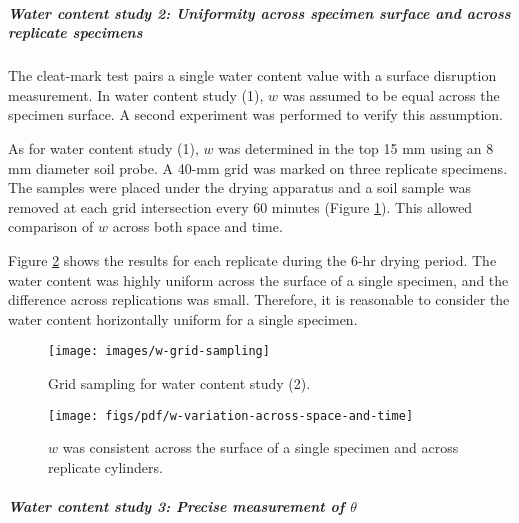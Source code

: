 \documentclass[
  letterpaper,
  openany]{book}
\begin{document}
\hypertarget{water-content-study-2-uniformity-across-specimen-surface-and-across-replicate-specimens}{%
\subparagraph{Water content study 2: Uniformity across specimen surface and across replicate specimens}\label{water-content-study-2-uniformity-across-specimen-surface-and-across-replicate-specimens}}

The cleat-mark test pairs a single water content value with a surface disruption measurement.
In water content study (1), \(w\) was assumed to be equal across the specimen surface.
A second experiment was performed to verify this assumption.

As for water content study (1), \(w\) was determined in the top 15 mm using an 8 mm diameter soil probe.
A 40-mm grid was marked on three replicate specimens. The samples were placed under the drying apparatus and a soil sample was removed at each grid intersection every 60 minutes (Figure \ref{fig:water-content-grid-photo}).
This allowed comparison of \(w\) across both space and time.

Figure \ref{fig:w-variation-across-space-and-time} shows the results for each replicate during the 6-hr drying period.
The water content was highly uniform across the surface of a single specimen, and the difference across replications was small.
Therefore, it is reasonable to consider the water content horizontally uniform for a single specimen.

\begin{figure}

{\centering \texttt{[image: images/w-grid-sampling]} 

}

\caption{Grid sampling for water content study (2).}\label{fig:water-content-grid-photo}
\end{figure}

\begin{figure}

{\centering \texttt{[image: figs/pdf/w-variation-across-space-and-time]} 

}

\caption[Spatial and temporal variation of $w$ for cleat-mark cylinders]{$w$ was consistent across the surface of a single specimen and across replicate cylinders.}\label{fig:w-variation-across-space-and-time}
\end{figure}

\hypertarget{sand-replacement-vs-scanner-for-theta}{%
\subparagraph{\texorpdfstring{Water content study 3: Precise measurement of \(\theta\)}{Water content study 3: Precise measurement of \textbackslash theta}}\label{sand-replacement-vs-scanner-for-theta}}
\end{document}
